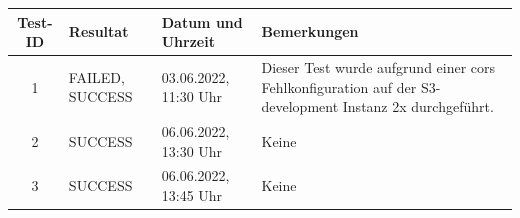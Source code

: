 \begin{table}[H]
  \begin{tabularx}{\linewidth}[H]{|c|l|l|X|}
    \hline
    \rowcolor{PrimaryColor!30} \textbf{Test-ID} & \textbf{Resultat} & \textbf{Datum und Uhrzeit} & \textbf{Bemerkungen}                                                                                          \\
    \hline
    1                                           & FAILED, SUCCESS   & 03.06.2022, 11:30 Uhr      & Dieser Test wurde aufgrund einer \gls{cors} Fehlkonfiguration auf der S3-development Instanz 2x durchgeführt. \\
    \hline
    2                                           & SUCCESS           & 06.06.2022, 13:30 Uhr      & Keine                                                                                                         \\
    \hline
    3                                           & SUCCESS           & 06.06.2022, 13:45 Uhr      & Keine                                                                                                         \\
    \hline
  \end{tabularx}
\end{table}
